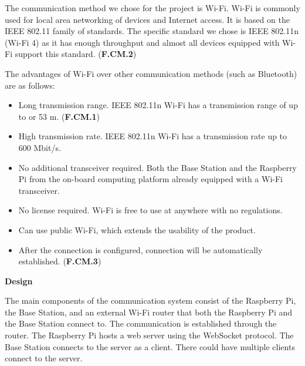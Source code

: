 The communication method we chose for the project is Wi-Fi. Wi-Fi is commonly used for local area networking of devices and Internet access. It is based on the IEEE 802.11 family of standards. The specific standard we chose is IEEE 802.11n (Wi-Fi 4) as it has enough throughput and almost all devices equipped with Wi-Fi support this standard. (\textbf{F.CM.2})

The advantages of Wi-Fi over other communication methods (such as Bluetooth) are as follows:
\begin{itemize}
    \item Long transmission range. IEEE 802.11n Wi-Fi has a transmission range of up to or 53 m. (\textbf{F.CM.1})
    \item High transmission rate. IEEE 802.11n Wi-Fi has a transmission rate up to 600 Mbit/s.
    \item No additional transceiver required. Both the Base Station and the Raspberry Pi from the on-board computing platform already equipped with a Wi-Fi transceiver.
    \item No license required. Wi-Fi is free to use at anywhere with no regulations.
    \item Can use public Wi-Fi, which extends the usability of the product.
    \item After the connection is configured, connection will be automatically established. (\textbf{F.CM.3})
\end{itemize}

\textbf{Design}

The main components of the communication system consist of the Raspberry Pi, the Base Station, and an external Wi-Fi router that both the Raspberry Pi and the Base Station connect to. The communication is established through the router. The Raspberry Pi hosts a web server using the WebSocket protocol. The Base Station connects to the server as a client. There could have multiple clients connect to the server.
